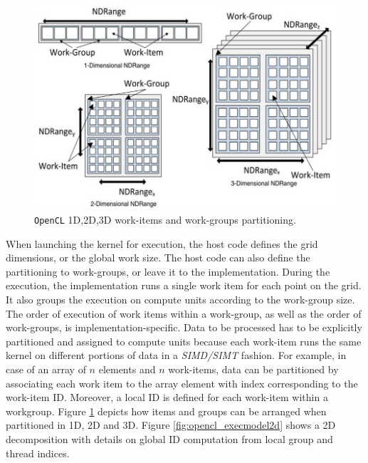     \begin{figure}
	\centering
	\includegraphics[width=1.0\textwidth]{./images/parallel_programming/opencl_execmodel}
	\caption{\texttt{OpenCL} 1D,2D,3D work-items and work-groups partitioning. }\label{fig:opencl_execmodel}
\end{figure}


    When launching the kernel for execution, the host code defines the grid dimensions, or the global work size. The host code can also define the partitioning to work-groups, or leave it to the implementation. During the execution, the implementation runs a single work item for each point on the grid. It also groups the execution on compute units according to the work-group size. The order of execution of work items within a work-group, as well as the order of work-groups, is implementation-specific.
    Data to be processed has to be explicitly partitioned and assigned to compute units because each work-item runs the same kernel on different portions of data in a \textit{SIMD/SIMT} fashion. For example, in case of an array of $n$ elements and $n$ work-items, data can be partitioned by associating each work item to the array element with index corresponding to the work-item ID. Moreover, a local ID is defined for each work-item    within a workgroup. Figure \ref{fig:opencl_execmodel} depicts how items and groups can be arranged when partitioned in 1D, 2D and 3D.
    Figure \ref{fig:opencl_execmodel2d} shows a 2D decomposition with details on global ID computation from local group and thread indices.
    
